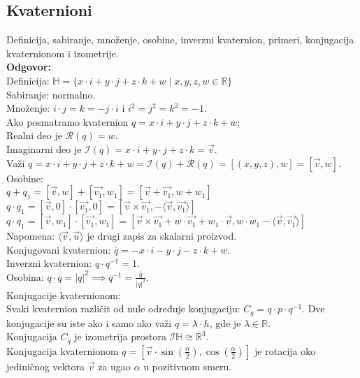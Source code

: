 \documentclass[12pt]{article}
\begin{document}
    \subsection{Kvaternioni}
    Definicija, sabiranje, množenje, osobine, inverzni
    kvaternion, primeri, konjugacija kvaternionom i izometrije.
    \\
    \textbf{Odgovor:}\\
    Definicija: $\mathbb{H}=\{x\cdot i+y\cdot j+z\cdot k+w\mid x,y,z,w\in\mathbb{R}\}$\\
    Sabiranje: normalno.\\
    Množenje: $i\cdot j=k=-j\cdot i$ i $i^2=j^2=k^2=-1$.\\
    Ako posmatramo kvaternion $q=x\cdot i +y\cdot j +z\cdot k+w$:\\
    Realni deo je $\mathcal{R}(q)=w$.\\
    Imaginarni deo je $\mathcal{I}(q)=x\cdot i +y\cdot j +z\cdot k=\overrightarrow{v}$.\\
    Važi $q=x\cdot i +y\cdot j +z\cdot k+w=\mathcal{I}(q)+\mathcal{R}(q)=[(x,y,z),w]=[\overrightarrow{v},w]$.\\
    Osobine:\\
$q+q_1=[\overrightarrow{v},w]+[\overrightarrow{v_1},w_1]=[\overrightarrow{v}+\overrightarrow{v_1},w+w_1]$\\
$q\cdot q_1=[\overrightarrow{v},0]\cdot[\overrightarrow{v_1},0]=[\overrightarrow{v}\times\overrightarrow{v_1},-\langle\overrightarrow{v},\overrightarrow{v_1}\rangle]$\\
$q\cdot q_1=[\overrightarrow{v},w_1]\cdot[\overrightarrow{v_1},w_1]=[\overrightarrow{v}\times\overrightarrow{v_1}+w\cdot \overrightarrow{v_1}+w_1\cdot\overrightarrow{v},w\cdot w_1-\langle\overrightarrow{v},\overrightarrow{v_1}\rangle]$\\
    Napomena: $\langle\overrightarrow{v},\overrightarrow{u}\rangle$ je drugi zapis za skalarni proizvod.\\
    Konjugovani kvaternion: $\overline{q}=-x\cdot i -y\cdot j -z\cdot k+w$.\\
    Inverzni kvaternion: $q\cdot q^{-1}=1$.\\
    Osobina: $q\cdot \overline{q}=|q|^2 \implies q^{-1}=\frac{\overline{q}}{|q|^2}$.\\
    Konjugacije kvaternionom:\\
    Svaki kvaternion različit od nule određuje konjugaciju: $C_q=q\cdot p \cdot q^{-1}$.
    Dve konjugacije su iste ako i samo ako važi $q=\lambda\cdot h$, gde je $\lambda\in\mathbb{R}$.\\
    Konjugacija $C_q$ je izometrija prostora $\mathcal{I}\mathbb{H}\cong\mathbb{R}^3$.\\
    Konjugacija kvaternionom $q=[\overrightarrow{v}\cdot\sin(\frac{\alpha}{2}),\cos(\frac{\alpha}{2})]$
    je rotacija oko jediničnog vektora $\overrightarrow{v}$
    za ugao $\alpha$ u pozitivnom smeru.
    \par
\end{document}
